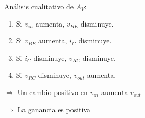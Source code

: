 \begin{frame}[t]
\begin{columns}
\begin{column}{0.7\textwidth}
            \vspace{5mm}
            Análisis cualitativo de $A_V$:

            \begin{enumerate}
                \item Si $v_{in}$ aumenta, $v_{BE}$ disminuye.
                \item Si $v_{BE}$ aumenta, $i_C$ disminuye.
                \item Si $i_C$ disminuye, $v_{RC}$ disminuye.
                \item Si $v_{RC}$ disminuye, $v_{out}$ aumenta.
            \end{enumerate}

            $\Rightarrow$ Un cambio positivo en $v_{in}$ aumenta $v_{out}$

            $\Rightarrow$ La ganancia es positiva
        \end{column}
    \end{columns}
\end{frame}

